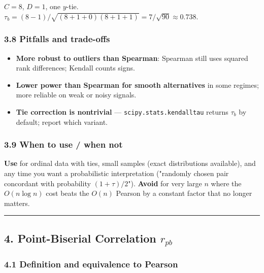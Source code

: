 \documentclass{article}
\providecommand{\tightlist}{\setlength{\itemsep}{0pt}\setlength{\parskip}{0pt}}
\begin{document}
\(C = 8\), \(D = 1\), one \(y\)-tie.
\(\tau_b = (8 - 1)/\sqrt{(8 + 1 + 0)(8 + 1 + 1)} = 7/\sqrt{90} \approx 0.738\).

\subsubsection{3.8 Pitfalls and
trade-offs}\label{38-pitfalls-and-trade-offs}

\begin{itemize}
\tightlist
\item
  \textbf{More robust to outliers than Spearman}: Spearman still uses
  squared rank differences; Kendall counts signs.
\item
  \textbf{Lower power than Spearman for smooth alternatives} in some
  regimes; more reliable on weak or noisy signals.
\item
  \textbf{Tie correction is nontrivial} ---
  \texttt{scipy.stats.kendalltau} returns \(\tau_b\) by default; report
  which variant.
\end{itemize}

\subsubsection{3.9 When to use / when
not}\label{39-when-to-use--when-not}

\textbf{Use} for ordinal data with ties, small samples (exact
distributions available), and any time you want a probabilistic
interpretation ("randomly chosen pair concordant with probability
\((1 + \tau)/2\)"). \textbf{Avoid} for very large \(n\) where the
\(O(n \log n)\) cost beats the \(O(n)\) Pearson by a constant factor
that no longer matters.

\begin{center}\rule{0.5\linewidth}{0.5pt}\end{center}

\subsection{\texorpdfstring{4. Point-Biserial Correlation
\(r_{pb}\)}{4. Point-Biserial Correlation r\_\{pb\}}}\label{4-point-biserial-correlation-r_pb}

\subsubsection{4.1 Definition and equivalence to
Pearson}\label{41-definition-and-equivalence-to-pearson}
\end{document}
